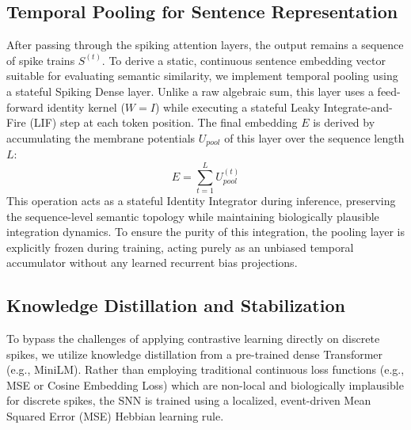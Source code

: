 \documentclass{article} %
\begin{document}
\subsection{Temporal Pooling for Sentence Representation}
After passing through the spiking attention layers, the output remains a sequence of spike trains $S^{(t)}$. To derive a static, continuous sentence embedding vector suitable for evaluating semantic similarity, we implement temporal pooling using a stateful Spiking Dense layer. Unlike a raw algebraic sum, this layer uses a feed-forward identity kernel ($W = I$) while executing a stateful Leaky Integrate-and-Fire (LIF) step at each token position. The final embedding $E$ is derived by accumulating the membrane potentials $U_{pool}$ of this layer over the sequence length $L$:
\begin{equation}
E = \sum_{t=1}^{L} U_{pool}^{(t)}
\end{equation}
This operation acts as a stateful Identity Integrator during inference, preserving the sequence-level semantic topology while maintaining biologically plausible integration dynamics. To ensure the purity of this integration, the pooling layer is explicitly frozen during training, acting purely as an unbiased temporal accumulator without any learned recurrent bias projections.

\subsection{Knowledge Distillation and Stabilization}
To bypass the challenges of applying contrastive learning directly on discrete spikes, we utilize knowledge distillation from a pre-trained dense Transformer (e.g., MiniLM). Rather than employing traditional continuous loss functions (e.g., MSE or Cosine Embedding Loss) which are non-local and biologically implausible for discrete spikes, the SNN is trained using a localized, event-driven Mean Squared Error (MSE) Hebbian learning rule. 
\end{document}
